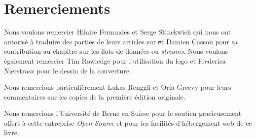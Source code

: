 \documentclass[a4paper,10pt,twoside]{book}
\begin{document}
\section*{Remerciements}


Nous voulons remercier Hilaire Fernandes et Serge Stinckwich qui nous
ont autoris\'e \`a traduire des parties de leurs articles sur \st et
Damien Cassou pour sa contribution au chapitre sur les flots de
donn\'ees ou \emph{streams}.
Nous voulons \'egalement remercier Tim Rowledge pour l'utilisation
du logo \sq et Frederica Nierstrasz pour le dessin de la couverture.

Nous remercions particuli\`erement Lukas Renggli et Orla Greevy pour leurs
commentaires sur les copies de la premi\`ere \'edition
originale.

Nous remercions l'Universit\'e de Berne en Suisse pour le soutien
gracieusement offert \`a cette entreprise \emph{Open Source} et pour
les facilit\'es d'h\'ebergement web de ce livre.



\ifx\wholebook\relax\else
   
   
\end{document}
